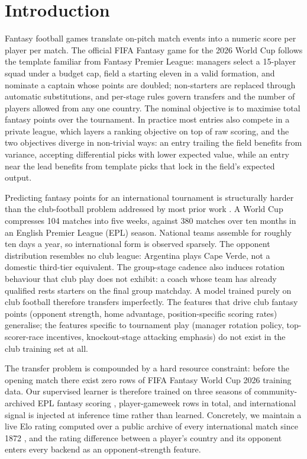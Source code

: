 \section{Introduction}
\label{sec:introduction}

Fantasy football games translate on-pitch match events into a numeric
score per player per match. The official FIFA Fantasy game for the
2026 World Cup follows the template familiar from Fantasy Premier
League: managers select a 15-player squad under a budget cap, field a
starting eleven in a valid formation, and nominate a captain whose
points are doubled; non-starters are replaced through automatic
substitutions, and per-stage rules govern transfers and the number of
players allowed from any one country. The nominal objective is to
maximise total fantasy points over the tournament. In practice most
entries also compete in a private league, which layers a ranking
objective on top of raw scoring, and the two objectives diverge in
non-trivial ways: an entry trailing the field benefits from variance,
accepting differential picks with lower expected value, while an
entry near the lead benefits from template picks that lock in the
field's expected output.

Predicting fantasy points for an international tournament is
structurally harder than the club-football problem addressed by most
prior work \citep{groos2025openfpl, mishra2025fpl}. A World Cup
compresses 104 matches into five weeks, against 380 matches over ten
months in an English Premier League (EPL) season. National teams
assemble for roughly ten days a year, so international form is
observed sparsely. The opponent distribution resembles no club
league: Argentina plays Cape Verde, not a domestic third-tier
equivalent. The group-stage cadence also induces rotation behaviour
that club play does not exhibit: a coach whose team has already
qualified rests starters on the final group matchday. A model trained
purely on club football therefore transfers imperfectly. The features
that drive club fantasy points (opponent strength, home advantage,
position-specific scoring rates) generalise; the features specific to
tournament play (manager rotation policy, top-scorer-race incentives,
knockout-stage attacking emphasis) do not exist in the club training
set at all.

The transfer problem is compounded by a hard resource constraint:
before the opening match there exist zero rows of FIFA Fantasy World
Cup 2026 training data. Our supervised learner is therefore trained
on three seasons of community-archived EPL fantasy scoring
\citep{vaastav}, \EplTrainingRows{}
player-gameweek rows in total, and international signal is injected
at inference time rather than learned. Concretely, we maintain a live
Elo rating \citep{elo1978rating, hvattum2010using, gilch2018elo}
computed over a public archive of every international match since
1872 \citep{martj42}, and the rating difference between a player's
country and its opponent enters every backend as an
opponent-strength feature.

